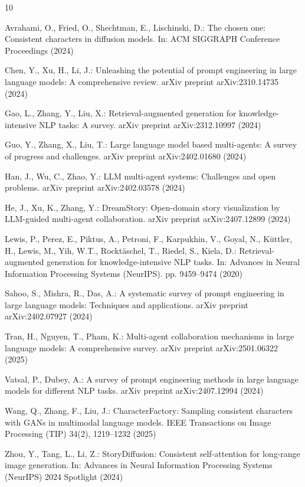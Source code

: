 \documentclass[runningheads]{llncs}
\begin{document}

\begin{thebibliography}{10}

Avrahami, O., Fried, O., Shechtman, E., Lischinski, D.:
The chosen one: Consistent characters in diffusion models.
In: ACM SIGGRAPH Conference Proceedings (2024)

Chen, Y., Xu, H., Li, J.:
Unleashing the potential of prompt engineering in large language models: A comprehensive review.
arXiv preprint arXiv:2310.14735 (2024)

Gao, L., Zhang, Y., Liu, X.:
Retrieval-augmented generation for knowledge-intensive NLP tasks: A survey.
arXiv preprint arXiv:2312.10997 (2024)

Guo, Y., Zhang, X., Liu, T.:
Large language model based multi-agents: A survey of progress and challenges.
arXiv preprint arXiv:2402.01680 (2024)

Han, J., Wu, C., Zhao, Y.:
LLM multi-agent systems: Challenges and open problems.
arXiv preprint arXiv:2402.03578 (2024)

He, J., Xu, K., Zhang, Y.:
DreamStory: Open-domain story visualization by LLM-guided multi-agent collaboration.
arXiv preprint arXiv:2407.12899 (2024)

Lewis, P., Perez, E., Piktus, A., Petroni, F., Karpukhin, V., Goyal, N., K{\"u}ttler, H., Lewis, M., Yih, W.T., Rockt{\"a}schel, T., Riedel, S., Kiela, D.:
Retrieval-augmented generation for knowledge-intensive NLP tasks.
In: Advances in Neural Information Processing Systems (NeurIPS). pp. 9459--9474 (2020)

Sahoo, S., Mishra, R., Das, A.:
A systematic survey of prompt engineering in large language models: Techniques and applications.
arXiv preprint arXiv:2402.07927 (2024)

Tran, H., Nguyen, T., Pham, K.:
Multi-agent collaboration mechanisms in large language models: A comprehensive survey.
arXiv preprint arXiv:2501.06322 (2025)

Vatsal, P., Dubey, A.:
A survey of prompt engineering methods in large language models for different NLP tasks.
arXiv preprint arXiv:2407.12994 (2024)

Wang, Q., Zhang, F., Liu, J.:
CharacterFactory: Sampling consistent characters with GANs in multimodal language models.
IEEE Transactions on Image Processing (TIP) 34(2), 1219--1232 (2025)

Zhou, Y., Tang, L., Li, Z.:
StoryDiffusion: Consistent self-attention for long-range image generation.
In: Advances in Neural Information Processing Systems (NeurIPS) 2024 Spotlight (2024)

\end{thebibliography}
\end{document}

